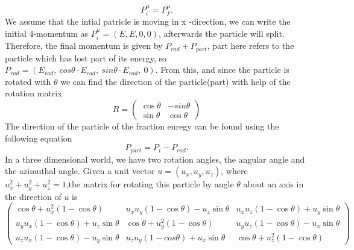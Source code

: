\begin{equation}
P_{i}^{\mu} = P_f^{\mu}.
\end{equation} 
We assume that the intial patricle is moving in x -direction, we can write the initial 4-momentum as $P_i^{\mu} = (E,E,0,0)$, afterwards the particle will split. Therefore, the final momentum is given by $P_{rad} + P_{part}$, part here refers to the particle which has lost part of its energy, so $P_{rad} = (E_{rad},\  cos\theta \cdot E_{rad},\  sin\theta \cdot E_{rad},\ 0)$. From this, and since the particle is rotated with $\theta$ we can find the direction of the particle(part) with help of the rotation matrix
\begin{equation} R = 
\begin{pmatrix}
\cos\theta & - sin\theta\\
\sin\theta & \cos\theta
\end{pmatrix}
\end{equation} The direction of the particle of the fraction enregy can be found using the following equation  \begin{equation}
P_{part} = P_{i} - P_{rad} .
\end{equation}    
In a three dimensional world, we have two rotation angles, the angular angle and the azimuthal angle. Given a unit vector $u =(u_x, u_y, u_z) $, where $u_x^2 + u_y^2 + u_z^2 = 1$,the matrix for rotating this particle by angle $\theta$ about an axis in the direction of $u$ is   
\begin{equation} 
\begin{pmatrix}
\cos\theta + u^2_x(1-\cos\theta) & u_x u_y (1-\cos\theta) - u_z \sin\theta& u_x u_z(1-\cos\theta)+ u_y \sin\theta\\

u_y u_x (1 - \cos\theta) + u_z \sin\theta & \cos\theta + u_y^2 (1 - \cos\theta) & u_y u_z (1 - \cos\theta) - u_x \sin\theta \\

u_z u_x (1 - \cos\theta) - u_y \sin\theta & u_z u_y (1 - cos\theta) + u_x \sin\theta & \cos\theta + u_z^2 (1 - \cos\theta)
\end{pmatrix}
\end{equation}


